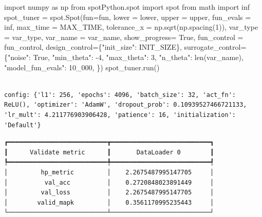 \documentclass[
  letterpaper,
  DIV=11,
  numbers=noendperiod]{scrreprt}
\newenvironment{Shaded}{\begin{snugshade}}{\end{snugshade}}
\newcommand{\BuiltInTok}[1]{\textcolor[rgb]{0.00,0.23,0.31}{#1}}
\newcommand{\DecValTok}[1]{\textcolor[rgb]{0.68,0.00,0.00}{#1}}
\newcommand{\ImportTok}[1]{\textcolor[rgb]{0.00,0.46,0.62}{#1}}
\newcommand{\NormalTok}[1]{\textcolor[rgb]{0.00,0.23,0.31}{#1}}
\newcommand{\OperatorTok}[1]{\textcolor[rgb]{0.37,0.37,0.37}{#1}}
\newcommand{\StringTok}[1]{\textcolor[rgb]{0.13,0.47,0.30}{#1}}
\newcommand{\VariableTok}[1]{\textcolor[rgb]{0.07,0.07,0.07}{#1}}
\begin{document}
\begin{Shaded}
\begin{Highlighting}[]
\ImportTok{import}\NormalTok{ numpy }\ImportTok{as}\NormalTok{ np}
\ImportTok{from}\NormalTok{ spotPython.spot }\ImportTok{import}\NormalTok{ spot}
\ImportTok{from}\NormalTok{ math }\ImportTok{import}\NormalTok{ inf}
\NormalTok{spot\_tuner }\OperatorTok{=}\NormalTok{ spot.Spot(fun}\OperatorTok{=}\NormalTok{fun,}
\NormalTok{                   lower }\OperatorTok{=}\NormalTok{ lower,}
\NormalTok{                   upper }\OperatorTok{=}\NormalTok{ upper,}
\NormalTok{                   fun\_evals }\OperatorTok{=}\NormalTok{ inf,}
\NormalTok{                   max\_time }\OperatorTok{=}\NormalTok{ MAX\_TIME,}
\NormalTok{                   tolerance\_x }\OperatorTok{=}\NormalTok{ np.sqrt(np.spacing(}\DecValTok{1}\NormalTok{)),}
\NormalTok{                   var\_type }\OperatorTok{=}\NormalTok{ var\_type,}
\NormalTok{                   var\_name }\OperatorTok{=}\NormalTok{ var\_name,}
\NormalTok{                   show\_progress}\OperatorTok{=} \VariableTok{True}\NormalTok{,}
\NormalTok{                   fun\_control }\OperatorTok{=}\NormalTok{ fun\_control,}
\NormalTok{                   design\_control}\OperatorTok{=}\NormalTok{\{}\StringTok{"init\_size"}\NormalTok{: INIT\_SIZE\},}
\NormalTok{                   surrogate\_control}\OperatorTok{=}\NormalTok{\{}\StringTok{"noise"}\NormalTok{: }\VariableTok{True}\NormalTok{,}
                                      \StringTok{"min\_theta"}\NormalTok{: }\OperatorTok{{-}}\DecValTok{4}\NormalTok{,}
                                      \StringTok{"max\_theta"}\NormalTok{: }\DecValTok{3}\NormalTok{,}
                                      \StringTok{"n\_theta"}\NormalTok{: }\BuiltInTok{len}\NormalTok{(var\_name),}
                                      \StringTok{"model\_fun\_evals"}\NormalTok{: }\DecValTok{10\_000}\NormalTok{,}
\NormalTok{                                      \})}
\NormalTok{spot\_tuner.run()}
\end{Highlighting}
\end{Shaded}

\begin{verbatim}

config: {'l1': 256, 'epochs': 4096, 'batch_size': 32, 'act_fn': ReLU(), 'optimizer': 'AdamW', 'dropout_prob': 0.10939527466721133, 'lr_mult': 4.211776903906428, 'patience': 16, 'initialization': 'Default'}
\end{verbatim}

\begin{verbatim}
┏━━━━━━━━━━━━━━━━━━━━━━━━━━━┳━━━━━━━━━━━━━━━━━━━━━━━━━━━┓
┃      Validate metric      ┃       DataLoader 0        ┃
┡━━━━━━━━━━━━━━━━━━━━━━━━━━━╇━━━━━━━━━━━━━━━━━━━━━━━━━━━┩
│         hp_metric         │    2.2675487995147705     │
│          val_acc          │    0.2720848023891449     │
│         val_loss          │    2.2675487995147705     │
│        valid_mapk         │    0.3561170995235443     │
└───────────────────────────┴───────────────────────────┘
\end{verbatim}
\end{document}
